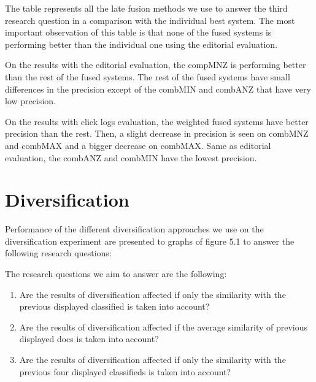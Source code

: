The table represents all the late fusion methods we use to answer the third research question in a comparison with the individual best system. The most important observation of this table is that none of the fused systems is performing better than the individual one using the editorial evaluation.

On the results with the editorial evaluation, the compMNZ is performing better than the rest of the fused systems. The rest of the fused systems have small differences in the precision except of the combMIN and combANZ that have very low precision.

On the results with click logs evaluation, the weighted fused systems have better precision than the rest. Then, a slight decrease in precision is seen on combMNZ and combMAX and a bigger decrease on combMAX. Same as editorial evaluation, the combANZ and combMIN have the lowest precision.


\section{Diversification}

Performance of the different diversification approaches we use on the diversification experiment are presented to graphs of figure 5.1 to answer the following research questions:

The research questions we aim to answer are the following:
\begin{enumerate}
\item Are the results of diversification affected if only the similarity with the previous displayed classified is taken into account?
\item Are the results of diversification affected if the average similarity of previous displayed docs is taken into account?
\item Are the results of diversification affected if only the similarity with the previous four displayed classifieds is taken into account?
\end{enumerate}

